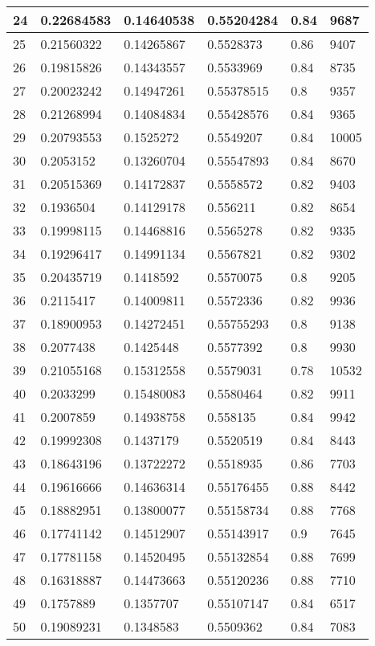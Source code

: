 \begin{longtable}{|l|l|l|l|l|l|}
24 & 0.22684583 & 0.14640538 & 0.55204284 & 0.84 & 9687 \\ \hline 
25 & 0.21560322 & 0.14265867 & 0.5528373 & 0.86 & 9407 \\ \hline 
26 & 0.19815826 & 0.14343557 & 0.5533969 & 0.84 & 8735 \\ \hline 
27 & 0.20023242 & 0.14947261 & 0.55378515 & 0.8 & 9357 \\ \hline 
28 & 0.21268994 & 0.14084834 & 0.55428576 & 0.84 & 9365 \\ \hline 
29 & 0.20793553 & 0.1525272 & 0.5549207 & 0.84 & 10005 \\ \hline 
30 & 0.2053152 & 0.13260704 & 0.55547893 & 0.84 & 8670 \\ \hline 
31 & 0.20515369 & 0.14172837 & 0.5558572 & 0.82 & 9403 \\ \hline 
32 & 0.1936504 & 0.14129178 & 0.556211 & 0.82 & 8654 \\ \hline 
33 & 0.19998115 & 0.14468816 & 0.5565278 & 0.82 & 9335 \\ \hline 
34 & 0.19296417 & 0.14991134 & 0.5567821 & 0.82 & 9302 \\ \hline 
35 & 0.20435719 & 0.1418592 & 0.5570075 & 0.8 & 9205 \\ \hline 
36 & 0.2115417 & 0.14009811 & 0.5572336 & 0.82 & 9936 \\ \hline 
37 & 0.18900953 & 0.14272451 & 0.55755293 & 0.8 & 9138 \\ \hline 
38 & 0.2077438 & 0.1425448 & 0.5577392 & 0.8 & 9930 \\ \hline 
39 & 0.21055168 & 0.15312558 & 0.5579031 & 0.78 & 10532 \\ \hline 
40 & 0.2033299 & 0.15480083 & 0.5580464 & 0.82 & 9911 \\ \hline 
41 & 0.2007859 & 0.14938758 & 0.558135 & 0.84 & 9942 \\ \hline 
42 & 0.19992308 & 0.1437179 & 0.5520519 & 0.84 & 8443 \\ \hline 
43 & 0.18643196 & 0.13722272 & 0.5518935 & 0.86 & 7703 \\ \hline 
44 & 0.19616666 & 0.14636314 & 0.55176455 & 0.88 & 8442 \\ \hline 
45 & 0.18882951 & 0.13800077 & 0.55158734 & 0.88 & 7768 \\ \hline 
46 & 0.17741142 & 0.14512907 & 0.55143917 & 0.9 & 7645 \\ \hline 
47 & 0.17781158 & 0.14520495 & 0.55132854 & 0.88 & 7699 \\ \hline 
48 & 0.16318887 & 0.14473663 & 0.55120236 & 0.88 & 7710 \\ \hline 
49 & 0.1757889 & 0.1357707 & 0.55107147 & 0.84 & 6517 \\ \hline 
50 & 0.19089231 & 0.1348583 & 0.5509362 & 0.84 & 7083 \\ \hline 
\end{longtable}